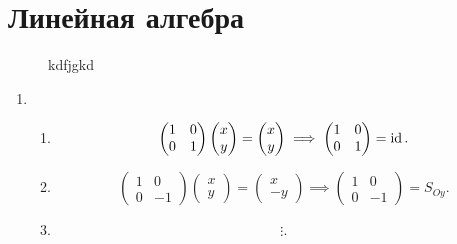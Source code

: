 \section{Линейная алгебра}
    \begin{figure}[ht]
        \centering
        \label{fig:kdfjgkd}
        \caption{kdfjgkd}
    \end{figure}
\begin{enumerate}
    \item 
        \begin{enumerate}
            \item \[
                    \begin{pmatrix} 1 & 0 \\ 0 & 1 \end{pmatrix}
                    \begin{pmatrix} x \\ y\end{pmatrix} =
                    \begin{pmatrix} x \\ y\end{pmatrix} \implies
                    \begin{pmatrix} 1 & 0 \\ 0 & 1 \end{pmatrix} = \operatorname{id}
                .\] 
            \item \[
                    \begin{pmatrix} 1 & 0 \\ 0 & -1 \end{pmatrix} 
                    \begin{pmatrix} x \\ y\end{pmatrix} = 
                    \begin{pmatrix} x \\ -y\end{pmatrix} \implies
                    \begin{pmatrix} 1 & 0 \\ 0 & -1 \end{pmatrix} = S_{Oy}
                .\] 
            \item  \[
            \vdots
            .\] 
        \end{enumerate}
\end{enumerate}

